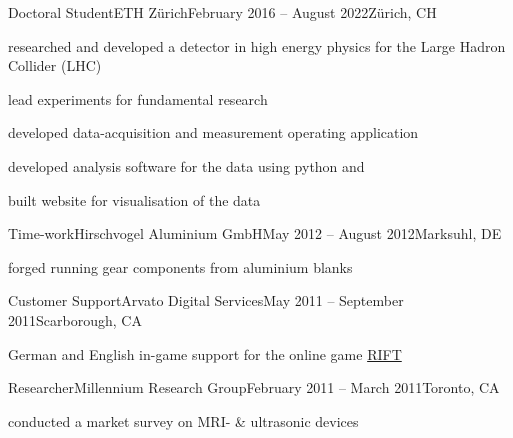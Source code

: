 \begin{cveventi}{Doctoral Student}{ETH Zürich}{February 2016 -- August 2022}{Z\"urich, CH}
  \item researched and developed a detector in high energy physics for the Large Hadron Collider (LHC)
  \item lead experiments for fundamental research
  \item developed data-acquisition and measurement operating application
  \item developed analysis software for the data using python and \cpp
  \item built website for visualisation of the data
\end{cveventi}
\divider
\begin{cveventis}{Time-work}{Hirschvogel Aluminium GmbH}{May 2012 -- August 2012}{Marksuhl, DE}
  \item forged running gear components from aluminium blanks
\end{cveventis}
%
\divider
%
\begin{cveventis}{Customer Support}{Arvato Digital Services}{May 2011 -- September 2011}{Scarborough, CA}
  \item German and English in-game support for the online game \href{https://www.trionworlds.com/rift/en/}{RIFT}
\end{cveventis}
%
\divider
%
\begin{cveventis}{Researcher}{Millennium Research Group}{February 2011 -- March 2011}{Toronto, CA}
  \item conducted a market survey on MRI- \& ultrasonic devices
\end{cveventis}
